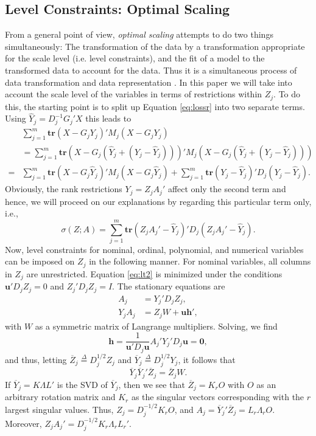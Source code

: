 \documentclass[article]{jss1}
\newcommand{\defi}{\mathop{=}\limits^{\Delta}}
\begin{document}
\subsection{Level Constraints: Optimal Scaling}
From a general point of view, \emph{optimal scaling} attempts to do two things simultaneously: The transformation of the data by a transformation appropriate for the scale level (i.e. level constraints), and the fit of a model to the transformed data to account for the data. Thus it is a simultaneous process of data transformation and data representation \citep{Takane:2005}. In this paper we will take into account the scale level of the variables in terms of restrictions within $Z_j$. To do this, the starting point is to split up Equation \ref{eq:lossr} into two separate terms. Using \(\hat Y_j=D_j^{-1}G_j'X\) this leads to 
\begin{eqnarray}
 & \sum_{j=1}^m \mathbf{tr}(X-G_jY_j)'M_j(X-G_jY_j) & \nonumber \\
& = \sum_{j=1}^m \mathbf{tr}(X-G_j(\hat Y_j + (Y_j - \hat Y_j)))'M_j(X-G_j(\hat Y_j + (Y_j - \hat Y_j))) & \nonumber \\
= & \sum_{j=1}^m\mathbf{tr}(X-G_j\hat Y_j)'M_j(X-G_j\hat Y_j)+\sum_{j=1}^m \mathbf{tr}(Y_j-\hat Y_j)'D_j(Y_j-\hat Y_j). &
\end{eqnarray}
Obviously, the rank restrictions $Y_j=Z_jA_j'$ affect only the second term and hence, we will proceed on our explanations by regarding this particular term only, i.e.,
\begin{equation}
\label{eq:lt2}
\sigma(Z;A)=\sum_{j=1}^m \mathbf{tr}(Z_jA_j'-\hat Y_j)'D_j(Z_jA_j'-\hat Y_j).
\end{equation}
Now, level constraints for nominal, ordinal, polynomial, and numerical variables can be imposed on $Z_j$ in the following manner. 
For nominal variables, all columns in $Z_j$ are unrestricted. Equation \ref{eq:lt2} is minimized under the conditions $\mathbf{u}'D_jZ_j=0$ and $Z_j'D_jZ_j=I$. The stationary equations are 
\begin{subequations}
\begin{align}
A_j&=Y_j'D_jZ_j,\\
Y_jA_j&=Z_jW+\mathbf{uh}',
\end{align}
\end{subequations}
with $W$ as a symmetric matrix of Langrange multipliers. Solving, we find
\begin{equation}
\mathbf{h}=\frac{1}{\mathbf{u}'D_j\mathbf{u}}A_j'Y_j'D_j\mathbf{u}=\mathbf{0},
\end{equation}
and thus, letting $\overline Z_j\defi D_j^{1/2}Z_j$ and $\overline Y_j\defi D_j^{1/2}Y_j$, it follows that
\begin{equation}
\overline Y_j\overline Y_j' \overline Z_j=\overline Z_jW.
\end{equation}
If $\overline Y_j=K\Lambda L'$ is the SVD of $\overline Y_j$, then
we see that $\overline Z_j=K_rO$ with $O$ as an arbitrary rotation matrix and $K_r$ as the singular vectors corresponding with the $r$ largest singular values. Thus, $Z_j=D_j^{-1/2}K_rO$, and $A_j=\overline Y_j'\overline Z_j=L_r\Lambda_r O$. Moreover, $Z_jA_j'=D_j^{-1/2}K_r\Lambda_rL_r'$.
\end{document}
